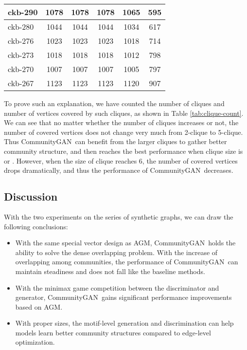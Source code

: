\documentclass[sigconf]{acmart}
\newcommand{\ComGAN}{CommunityGAN}
\begin{document}
\begin{table}[tbp]
\begin{tabular}{cccccc}
\multicolumn{1}{|l|}{ckb-290} & \multicolumn{1}{c|}{1078} & \multicolumn{1}{c|}{1078} & \multicolumn{1}{c|}{1078} & \multicolumn{1}{c|}{1065} & \multicolumn{1}{c|}{595} \\ \hline
\multicolumn{1}{|l|}{ckb-280} & \multicolumn{1}{c|}{1044} & \multicolumn{1}{c|}{1044} & \multicolumn{1}{c|}{1044} & \multicolumn{1}{c|}{1034} & \multicolumn{1}{c|}{617} \\ \hline
\multicolumn{1}{|l|}{ckb-276} & \multicolumn{1}{c|}{1023} & \multicolumn{1}{c|}{1023} & \multicolumn{1}{c|}{1023} & \multicolumn{1}{c|}{1018} & \multicolumn{1}{c|}{714} \\ \hline
\multicolumn{1}{|l|}{ckb-273} & \multicolumn{1}{c|}{1018} & \multicolumn{1}{c|}{1018} & \multicolumn{1}{c|}{1018} & \multicolumn{1}{c|}{1012} & \multicolumn{1}{c|}{798} \\ \hline
\multicolumn{1}{|l|}{ckb-270} & \multicolumn{1}{c|}{1007} & \multicolumn{1}{c|}{1007} & \multicolumn{1}{c|}{1007} & \multicolumn{1}{c|}{1005} & \multicolumn{1}{c|}{797} \\ \hline
\multicolumn{1}{|l|}{ckb-267} & \multicolumn{1}{c|}{1123} & \multicolumn{1}{c|}{1123} & \multicolumn{1}{c|}{1123} & \multicolumn{1}{c|}{1120} & \multicolumn{1}{c|}{907} \\ \hline
\end{tabular}
\end{table}

To prove such an explanation, we have counted the number of cliques and number of vertices covered by such cliques, as shown in Table \ref{tab:clique-count}.
We can see that no matter whether the number of cliques increases or not, the number of covered vertices does not change very much from 2-clique to 5-clique.
Thus \ComGAN~can benefit from the larger cliques to gather better community structure, and then reaches the best performance when clique size is  or .
However, when the size of clique reaches 6, the number of covered vertices drops dramatically, and thus the performance of \ComGAN~decreases.

\subsection{Discussion}

With the two experiments on the series of synthetic graphs, we can draw the following conclusions:
\begin{itemize}
  \item With the same special vector design as AGM, \ComGAN~holds the ability to solve the dense overlapping problem. With the increase of overlapping among communities, the performance of \ComGAN~can maintain steadiness and does not fall like the baseline methods.
  \item With the minimax game competition between the discriminator and generator, \ComGAN~gains significant performance improvements based on AGM.
  \item With proper sizes, the motif-level generation and discrimination can help models learn better community structures compared to edge-level optimization.
\end{itemize}
\end{document}
